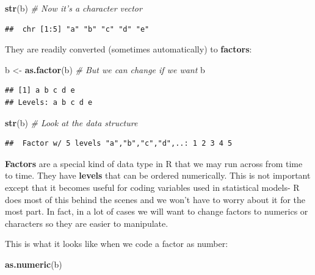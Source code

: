 \documentclass[
]{book}
\newenvironment{Shaded}{\begin{snugshade}}{\end{snugshade}}
\newcommand{\CommentTok}[1]{\textcolor[rgb]{0.56,0.35,0.01}{\textit{#1}}}
\newcommand{\KeywordTok}[1]{\textcolor[rgb]{0.13,0.29,0.53}{\textbf{#1}}}
\newcommand{\NormalTok}[1]{#1}
\newcommand{\StringTok}[1]{\textcolor[rgb]{0.31,0.60,0.02}{#1}}
\begin{document}
\begin{Shaded}
\begin{Highlighting}[]
\KeywordTok{str}\NormalTok{(b) }\CommentTok{# Now it's a character vector}
\end{Highlighting}
\end{Shaded}

\begin{verbatim}
##  chr [1:5] "a" "b" "c" "d" "e"
\end{verbatim}

They are readily converted (sometimes automatically) to \textbf{factors}:

\begin{Shaded}
\begin{Highlighting}[]
\NormalTok{b <-}\StringTok{ }\KeywordTok{as.factor}\NormalTok{(b) }\CommentTok{# But we can change if we want}
\NormalTok{b}
\end{Highlighting}
\end{Shaded}

\begin{verbatim}
## [1] a b c d e
## Levels: a b c d e
\end{verbatim}

\begin{Shaded}
\begin{Highlighting}[]
\KeywordTok{str}\NormalTok{(b) }\CommentTok{# Look at the data structure}
\end{Highlighting}
\end{Shaded}

\begin{verbatim}
##  Factor w/ 5 levels "a","b","c","d",..: 1 2 3 4 5
\end{verbatim}

\textbf{Factors} are a special kind of data type in R that we may run across from time to time. They have \textbf{levels} that can be ordered numerically. This is not important except that it becomes useful for coding variables used in statistical models- R does most of this behind the scenes and we won't have to worry about it for the most part. In fact, in a lot of cases we will want to change factors to numerics or characters so they are easier to manipulate.

This is what it looks like when we code a factor as number:

\begin{Shaded}
\begin{Highlighting}[]
\KeywordTok{as.numeric}\NormalTok{(b)}
\end{Highlighting}
\end{Shaded}
\end{document}
